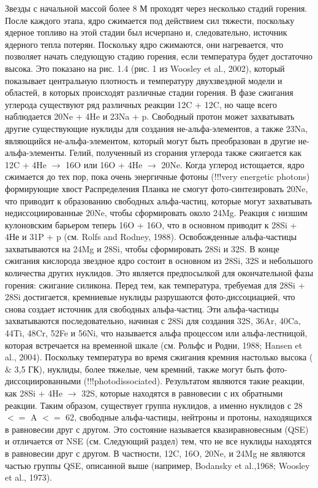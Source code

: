 \documentclass[%
bachelor,    %
natbib,      %
subf,        %
href,        %
colorlinks,  %
]{disser}
\begin{document}
Звезды с начальной массой более 8 М проходят через несколько стадий горения. После каждого этапа, ядро сжимается под действием сил тяжести, поскольку ядерное топливо на этой стадии был исчерпано и, следовательно, источник ядерного тепла потерян. Поскольку ядро сжимаются, они нагревается, что позволяет начать следующую стадию горения, если температура будет достаточно высока. Это показано на рис. 1.4 (рис. 1 из Woosley et al., 2002), который показывает центральную плотность и температуру двухзвездной модели и областей, в которых происходят различные стадии горения. В фазе сжигания углерода существуют ряд различных реакции 12C + 12C, но чаще всего наблюдается 20Ne + 4He и 23Na + p. Свободный протон может захватывать другие существующие нуклиды для создания не-альфа-элементов, а также 23Na, являющийся не-альфа-элементом, который могут быть преобразован в другие не-альфа-элементы. Гелий, полученный из сгорания углерода также сжигается как 12C + 4He $\rightarrow$ 16O или 16O + 4He $\rightarrow$ 20Ne. Когда углерод истощается, ядро сжимается до тех пор, пока очень энергичные фотоны (!!!very energetic photons) формирующие хвост Распределения Планка не смогут фото-синтезировать 20Ne, что приводит к образованию свободных альфа-частиц, которые могут захватывать недиссоциированные 20Ne, чтобы сформировать около 24Mg. Реакция с низшим кулоновским барьером теперь 16O + 16O, что в основном приводит к 28Si + 4Не и 31P + p (см. Rolfs and Rodney, 1988). Освобожденные альфа-частицы захватываются на 24Mg и 28Si, чтобы сформировать 28Si и 32S.
В конце сжигания кислорода звездное ядро состоит в основном из 28Si, 32S и небольшого количества других нуклидов. Это является предпосылкой для окончательной фазы горения: сжигание силикона. Перед тем, как температура, требуемая для 28Si + 28Si достигается, кремниевые нуклиды разрушаются фото-диссоциацией, что снова создает источник для свободных альфа-частиц. Эти альфа-частицы захватываются последовательно, начиная с 28Si для создания 32S, 36Ar, 40Ca, 44Ti, 48Cr, 52Fe и 56Ni, что называется альфа процессом или альфа-лестницой, которая встречается на временной шкале (см. Рольфс и Родни, 1988; Hansen et al., 2004). Поскольку температура во время сжигания кремния настолько высока ($\&$ 3,5 ГК), нуклиды, более тяжелые, чем кремний, также могут быть фото-диссоциированными (!!!photodissociated). Результатом являются такие реакции, как 28Si + 4He $\rightarrow$ 32S, которые находятся в равновесии с их обратными реакции. Таким образом, существует группа нуклидов, а именно нуклидов с 28 $<=$ A $<=$ 62, свободные альфа-частицы, нейтроны и протоны, находящихся в равновесии друг с другом. Это состояние называется квазиравновесным (QSE) и отличается от NSE (см. Следующий раздел) тем, что не все нуклиды находятся в равновесии друг с другом. В частности, 12C, 16O, 20Ne, и 24Mg не являются частью группы QSE, описанной выше (например, Bodansky et al.,1968; Woosley et al., 1973).
\end{document}
